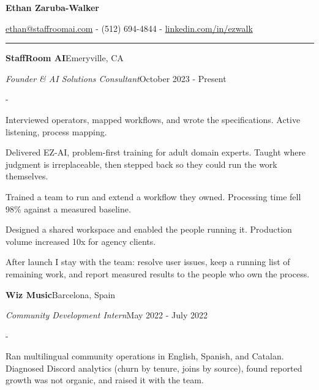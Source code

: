 \documentclass[10pt,letterpaper]{article}
\newenvironment{cvitems}{%
  \begin{list}{-}{%
    \setlength{\leftmargin}{12pt}%
    \setlength{\itemsep}{1.2pt}%
    \setlength{\parsep}{0pt}%
    \setlength{\topsep}{1.5pt}%
    \setlength{\partopsep}{0pt}%
    \setlength{\labelwidth}{6pt}%
    \setlength{\labelsep}{6pt}%
    \setlength{\itemindent}{0pt}%
  }%
}{\end{list}}
\newcommand{\cvsection}[1]{%
  \vspace{7pt}%
  \noindent{\bfseries\fontsize{11pt}{13pt}\selectfont\MakeUppercase{#1}}\par
  \vspace{1pt}%
  \noindent\rule{\textwidth}{0.4pt}\par
  \vspace{4pt}%
}
\newcommand{\cventryhead}[4]{%
  \noindent\textbf{#1}\hfill#2\par
  \vspace{0.5pt}%
  \noindent\textit{#3}\hfill#4\par
}
\begin{document}
\begin{center}
  {\bfseries\fontsize{22pt}{24pt}\selectfont Ethan Zaruba-Walker\par}
  \vspace{4pt}
  {\fontsize{10pt}{12pt}\selectfont
    \href{mailto:ethan@staffroomai.com}{ethan@staffroomai.com}
    {-}
    (512) 694-4844
    {-}
    \href{https://linkedin.com/in/ezwalk}{linkedin.com/in/ezwalk}\par}
\end{center}
\vspace{2pt}

\cvsection{Experience}

\cventryhead{StaffRoom AI}{Emeryville, CA}
{Founder \& AI Solutions Consultant}{October 2023 - Present}
\begin{cvitems}
  \item Interviewed operators, mapped workflows, and wrote the specifications. Active listening, process mapping.
  \item Delivered EZ-AI, problem-first training for adult domain experts. Taught where judgment is irreplaceable, then stepped back so they could run the work themselves.
  \item Trained a team to run and extend a workflow they owned. Processing time fell 98\% against a measured baseline.
  \item Designed a shared workspace and enabled the people running it. Production volume increased 10x for agency clients.
  \item After launch I stay with the team: resolve user issues, keep a running list of remaining work, and report measured results to the people who own the process.
\end{cvitems}

\vspace{3pt}
\cventryhead{Wiz Music}{Barcelona, Spain}
{Community Development Intern}{May 2022 - July 2022}
\begin{cvitems}
  \item Ran multilingual community operations in English, Spanish, and Catalan. Diagnosed Discord analytics (churn by tenure, joins by source), found reported growth was not organic, and raised it with the team.
\end{cvitems}
\end{document}
